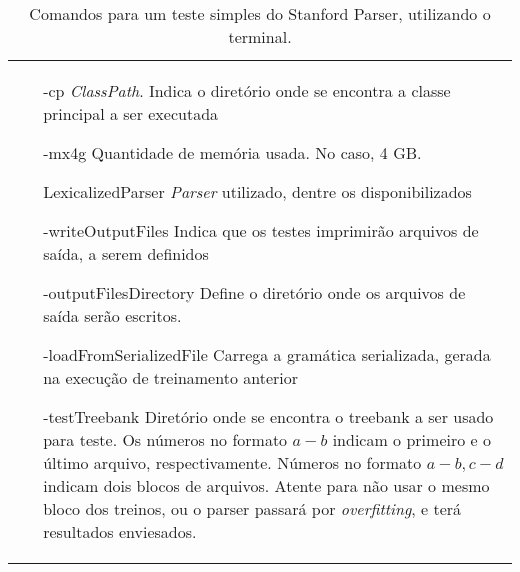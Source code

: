 \begin{table}[h!]
    \centering
    \begin{tabular}{p{}}
        \begin{itemize}
            \item [-cp] \textit{ClassPath}. Indica o diretório onde se encontra a classe principal a ser executada
            \item [-mx4g] Quantidade de memória usada. No caso, 4 GB.
            \item [LexicalizedParser] \textit{Parser} utilizado, dentre os disponibilizados
            \item [-writeOutputFiles ] Indica que os testes imprimirão arquivos de saída, a serem definidos
            \item [-outputFilesDirectory] Define o diretório onde os arquivos de saída serão escritos. 
            \item [-loadFromSerializedFile] Carrega a gramática serializada, gerada na execução de treinamento anterior
            \item [-testTreebank] Diretório onde se encontra o treebank a ser usado para teste. Os números no formato $a-b$ indicam o primeiro e o último arquivo, respectivamente. Números no formato $a-b,c-d$ indicam dois blocos de arquivos. Atente para não usar o mesmo bloco dos treinos, ou o parser passará por \textit{overfitting}, e terá resultados enviesados.
        \end{itemize}
    \end{tabular}
    \caption[Comandos para um teste simples do Stanford Parser]{Comandos para um teste simples do Stanford Parser, utilizando o terminal.}
    \label{tab:tab_teste_basico_cintil}
\end{table}